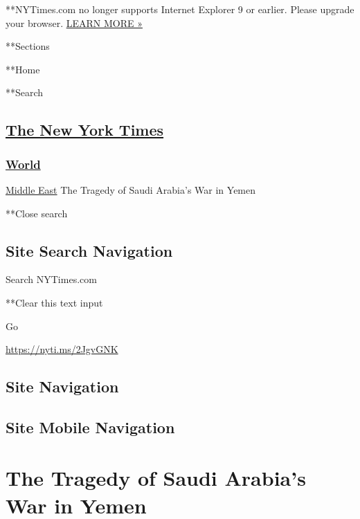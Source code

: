  **NYTimes.com no longer supports Internet Explorer 9 or earlier. Please
upgrade your browser.
\href{http://www.nytimes.com/content/help/site/ie9-support.html}{LEARN
MORE »}

**Sections

**Home

**Search

\hypertarget{the-new-york-times}{%
\subsection{\texorpdfstring{\href{http://www.nytimes.com/}{The New York
Times}}{The New York Times}}\label{the-new-york-times}}

\hypertarget{-world-}{%
\subsubsection{\texorpdfstring{ \href{/section/world}{World}
}{ World }}\label{-world-}}

 \href{/section/world/middleeast}{Middle East} \textbar{}The Tragedy of
Saudi Arabia's War in Yemen

**Close search

\hypertarget{site-search-navigation}{%
\subsection{Site Search Navigation}\label{site-search-navigation}}

Search NYTimes.com

**Clear this text input

Go

\url{https://nyti.ms/2JgvGNK}

\hypertarget{site-navigation}{%
\subsection{Site Navigation}\label{site-navigation}}

\hypertarget{site-mobile-navigation}{%
\subsection{Site Mobile Navigation}\label{site-mobile-navigation}}

\hypertarget{the-tragedy-of-saudi-arabias-war-in-yemen}{%
\section{The Tragedy of Saudi Arabia's War in
Yemen}\label{the-tragedy-of-saudi-arabias-war-in-yemen}}

